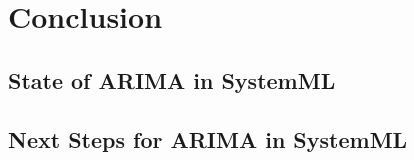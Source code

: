 \chapter{Conclusion}

\section{State of ARIMA in SystemML}
\section{Next Steps for ARIMA in SystemML}


















